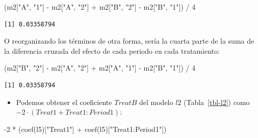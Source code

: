 \documentclass[
  12pt,
  a4paper,
  extrafontsizes,
  onecolumn,
  openright,
  table]{memoir}
\newenvironment{Shaded}{\begin{snugshade}}{\end{snugshade}}
\newcommand{\DecValTok}[1]{\textcolor[rgb]{0.68,0.00,0.00}{#1}}
\newcommand{\FunctionTok}[1]{\textcolor[rgb]{0.28,0.35,0.67}{#1}}
\newcommand{\NormalTok}[1]{\textcolor[rgb]{0.00,0.23,0.31}{#1}}
\newcommand{\SpecialCharTok}[1]{\textcolor[rgb]{0.37,0.37,0.37}{#1}}
\newcommand{\StringTok}[1]{\textcolor[rgb]{0.13,0.47,0.30}{#1}}
\providecommand{\tightlist}{%
  \setlength{\itemsep}{0pt}\setlength{\parskip}{0pt}}\usepackage{longtable,booktabs,array}
\begin{document}
\scriptsize

\begin{Shaded}
\begin{Highlighting}[]
\NormalTok{(m2[}\StringTok{"A"}\NormalTok{, }\StringTok{"1"}\NormalTok{] }\SpecialCharTok{{-}}\NormalTok{ m2[}\StringTok{"A"}\NormalTok{, }\StringTok{"2"}\NormalTok{] }\SpecialCharTok{+}\NormalTok{ m2[}\StringTok{"B"}\NormalTok{, }\StringTok{"2"}\NormalTok{] }\SpecialCharTok{{-}}\NormalTok{ m2[}\StringTok{"B"}\NormalTok{, }\StringTok{"1"}\NormalTok{]) }\SpecialCharTok{/} \DecValTok{4}
\end{Highlighting}
\end{Shaded}

\begin{verbatim}
[1] 0.03358794
\end{verbatim}

\normalsize

O reorganizando los términos de otra forma, sería la cuarta parte de la
suma de la diferencia cruzada del efecto de cada periodo en cada
tratamiento:

\scriptsize

\begin{Shaded}
\begin{Highlighting}[]
\NormalTok{(m2[}\StringTok{"B"}\NormalTok{, }\StringTok{"2"}\NormalTok{] }\SpecialCharTok{{-}}\NormalTok{ m2[}\StringTok{"A"}\NormalTok{, }\StringTok{"2"}\NormalTok{] }\SpecialCharTok{+}\NormalTok{ m2[}\StringTok{"A"}\NormalTok{, }\StringTok{"1"}\NormalTok{] }\SpecialCharTok{{-}}\NormalTok{ m2[}\StringTok{"B"}\NormalTok{, }\StringTok{"1"}\NormalTok{]) }\SpecialCharTok{/} \DecValTok{4}
\end{Highlighting}
\end{Shaded}

\begin{verbatim}
[1] 0.03358794
\end{verbatim}

\normalsize

\begin{itemize}
\tightlist
\item
  Podemos obtener el coeficiente \(TreatB\) del modelo \(l2\)
  (Tabla~\ref{tbl-l2}) como \(-2 \cdot (Treat1 + Treat1:Period1)\):
\end{itemize}

\scriptsize

\begin{Shaded}
\begin{Highlighting}[]
\SpecialCharTok{{-}}\DecValTok{2} \SpecialCharTok{*}\NormalTok{ (}\FunctionTok{coef}\NormalTok{(l5)[}\StringTok{"Treat1"}\NormalTok{] }\SpecialCharTok{+} \FunctionTok{coef}\NormalTok{(l5)[}\StringTok{"Treat1:Period1"}\NormalTok{])}
\end{Highlighting}
\end{Shaded}
\end{document}
